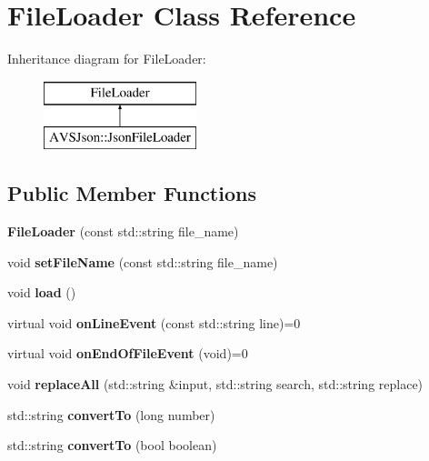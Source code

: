 \hypertarget{classFileLoader}{}\section{File\+Loader Class Reference}
\label{classFileLoader}
Inheritance diagram for File\+Loader\+:\begin{figure}[H]
\begin{center}
\leavevmode
\includegraphics[height=2.000000cm]{d6/dc2/classFileLoader}
\end{center}
\end{figure}
\subsection*{Public Member Functions}
\begin{DoxyCompactItemize}
\item 
\mbox{\label{classFileLoader_acf79b58743d2cbe7ff9cfb7dbd9d0f41}} 
{\bfseries File\+Loader} (const std\+::string file\+\_\+name)
\item 
\mbox{\label{classFileLoader_aad27b1e65065793fe7329c7a4748c1ec}} 
void {\bfseries set\+File\+Name} (const std\+::string file\+\_\+name)
\item 
\mbox{\label{classFileLoader_aea473d22b9d3da6c60bd4da463cb29b6}} 
void {\bfseries load} ()
\item 
\mbox{\label{classFileLoader_af70b4c26a019ca0b3aca1e62cf894a8a}} 
virtual void {\bfseries on\+Line\+Event} (const std\+::string line)=0
\item 
\mbox{\label{classFileLoader_aea70e4f31438f22dfb37b18793269299}} 
virtual void {\bfseries on\+End\+Of\+File\+Event} (void)=0
\item 
\mbox{\label{classFileLoader_a7843d56d0d1c5238b886180a154c43e9}} 
void {\bfseries replace\+All} (std\+::string \&input, std\+::string search, std\+::string replace)
\item 
\mbox{\label{classFileLoader_a587614f144fa4791a61a769a28644aca}} 
std\+::string {\bfseries convert\+To} (long number)
\item 
\mbox{\label{classFileLoader_a9f8050d7d81f4974c1e7e14c0a082b25}} 
std\+::string {\bfseries convert\+To} (bool boolean)
\end{DoxyCompactItemize}


